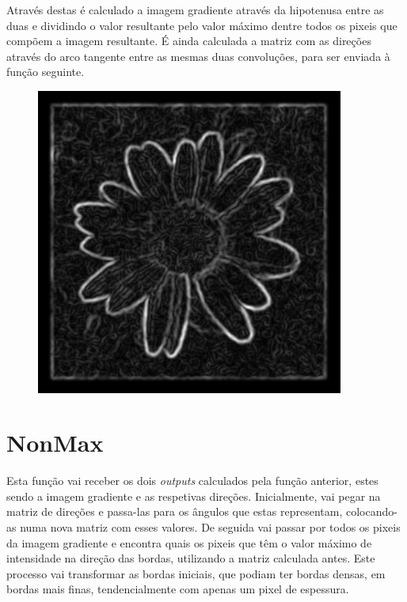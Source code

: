 \documentclass[a4paper]{report}
\begin{document}
Através destas é calculado a imagem gradiente através da hipotenusa entre as duas e dividindo o
valor resultante pelo valor máximo dentre todos os pixeis que compõem a imagem resultante. É ainda
calculada a matriz com as direções através do arco tangente entre as mesmas duas convoluções, para
ser enviada à função seguinte.  


\begin{figure}[H]
\centering
\begin{minipage}{.5\textwidth}
  \centering
    \includegraphics[width=0.9\textwidth]{images/Canny/flowerGrad.png}
\end{minipage}%
\end{figure}


\section{NonMax}
Esta função vai receber os dois \textit{outputs} calculados pela função anterior, estes sendo a
imagem gradiente e as respetivas direções. Inicialmente, vai pegar na matriz de direções e
passa-las para os ângulos que estas representam, colocando-as numa nova matriz com esses valores.
De seguida vai passar por todos os pixeis da imagem gradiente e encontra quais os pixeis que têm o
valor máximo de intensidade na direção das bordas, utilizando a matriz calculada antes. Este
processo vai transformar as bordas iniciais, que podiam ter bordas densas, em bordas mais finas,
tendencialmente com apenas um pixel de espessura.\\
\end{document}
